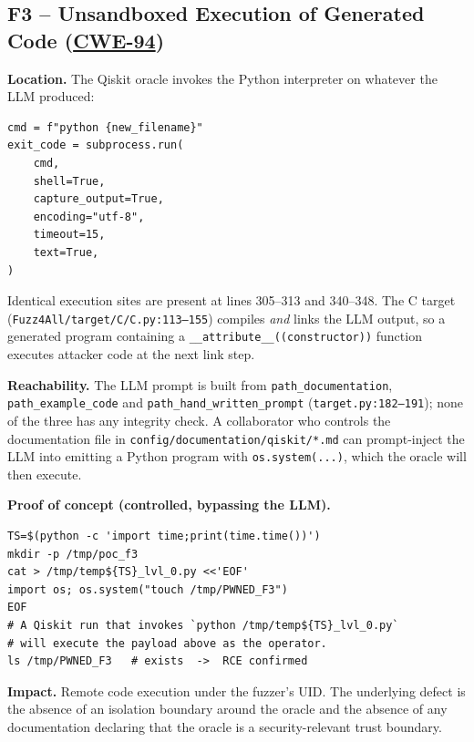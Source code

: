 \documentclass[conference]{IEEEtran}
\newcommand{\cwe}[1]{\href{https://cwe.mitre.org/data/definitions/#1.html}{CWE-#1}}
\begin{document}
\subsection{F3 -- Unsandboxed Execution of Generated Code (\cwe{94})}

\textbf{Location.} The Qiskit oracle invokes the Python interpreter on
whatever the LLM produced:

\begin{lstlisting}[style=py,caption={Fuzz4All/target/QISKIT/QISKIT.py lines 264--272.},firstnumber=264]
cmd = f"python {new_filename}"
exit_code = subprocess.run(
    cmd,
    shell=True,
    capture_output=True,
    encoding="utf-8",
    timeout=15,
    text=True,
)
\end{lstlisting}

Identical execution sites are present at lines 305--313 and 340--348.
The C target (\texttt{Fuzz4All/target/C/C.py:113--155}) compiles
\emph{and} links the LLM output, so a generated program containing a
\texttt{\_\_attribute\_\_((constructor))} function executes attacker
code at the next link step.

\textbf{Reachability.} The LLM prompt is built from
\texttt{path\_documentation}, \texttt{path\_example\_code} and
\texttt{path\_hand\_written\_prompt} (\texttt{target.py:182--191}); none
of the three has any integrity check. A collaborator who controls the
documentation file in
\texttt{config/documentation/qiskit/*.md} can prompt-inject the LLM into
emitting a Python program with \verb|os.system(...)|, which the oracle
will then execute.

\textbf{Proof of concept (controlled, bypassing the LLM).}

\begin{lstlisting}[style=sh,caption={F3 proof of concept.},label={lst:f3poc}]
TS=$(python -c 'import time;print(time.time())')
mkdir -p /tmp/poc_f3
cat > /tmp/temp${TS}_lvl_0.py <<'EOF'
import os; os.system("touch /tmp/PWNED_F3")
EOF
# A Qiskit run that invokes `python /tmp/temp${TS}_lvl_0.py`
# will execute the payload above as the operator.
ls /tmp/PWNED_F3   # exists  ->  RCE confirmed
\end{lstlisting}

\textbf{Impact.} Remote code execution under the fuzzer's UID. The
underlying defect is the absence of an isolation boundary around the
oracle and the absence of any documentation declaring that the oracle is
a security-relevant trust boundary.
\end{document}

